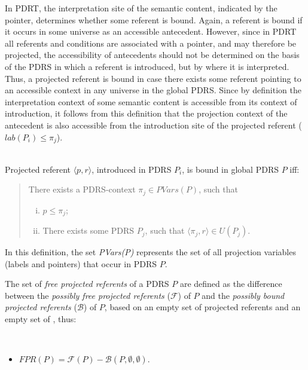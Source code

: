In PDRT, the interpretation site of the semantic content, indicated by the
pointer, determines whether some referent is bound. Again, a referent is
bound if it occurs in some universe as an accessible antecedent. However,
since in PDRT all referents and conditions are associated with a pointer,
and may therefore be projected, the accessibility of antecedents should not
be determined on the basis of the PDRS in which a referent is introduced,
but by where it is interpreted. Thus, a projected referent is bound in case
there exists some referent pointing to an accessible context in any universe
in the global PDRS. Since by definition the interpretation context of some
semantic content is accessible from its context of introduction, it follows
from this definition that the projection context of the antecedent is also
accessible from the introduction site of the projected referent ($lab(P_i)
\leq \pi_j$). 

\begin{definition}~\\
Projected referent $\langle p,r\rangle$, introduced in PDRS $P_i$, is bound
in global PDRS $P$ iff:
\begin{quote}
There exists a PDRS-context $\pi_j \in PVars(P)$, such that
\begin{enumerate}[i.]
  \item $p \leq \pi_j$; 
  \item There exists some PDRS $P_j$, such that 
    $\langle \pi_j,r\rangle \in U(P_j)$.
\end{enumerate}
\end{quote}
\end{definition}

\noindent In this definition, the set \textit{PVars(P)} represents the set
of all projection variables (labels and pointers) that occur in PDRS $P$.


The set of \textit{free projected referents} of a PDRS $P$ are defined as the
difference between the \textit{possibly free projected referents} ($\mathcal{F}$) of
$P$ and the \textit{possibly bound projected referents} ($\mathcal{B}$) of $P$, based
on an empty set of projected referents and an empty set of \MAPs, thus:

\begin{definition}~
  \begin{itemize}
    \item $FPR(P) = \mathcal{F}(P) - \mathcal{B}(P,\emptyset,\emptyset)$.
  \end{itemize}
\end{definition}

